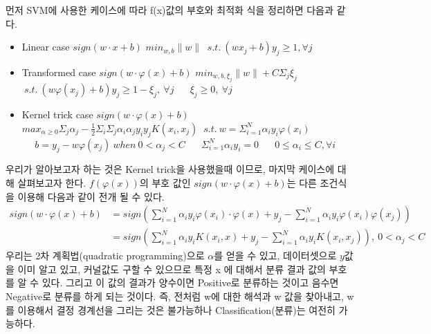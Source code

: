 \documentclass[a4paper]{oblivoir}
\begin{document}
\indent 먼저 SVM에 사용한 케이스에 따라 f(x)값의 부호와 최적화 식을 정리하면 다음과 같다.
\begin{itemize}\setlength\itemsep{-\parsep}
\item Linear case
\subitem $sign(w\cdot x+b)$
\subitem $min_{w,b} {\lVert w\rVert}$
\subitem $\ s.t.\ (wx_j+b)y_j\geq 1, \forall j$
\end{itemize}
\begin{itemize}\setlength\itemsep{-\parsep}
\item Transformed case
\subitem $sign(w\cdot\varphi(x)+b)$
\subitem $min_{w,b,\xi_j} {\lVert w\rVert}+C\Sigma_j \xi_j$
\subitem $\ s.t.\ (w\varphi(x_j)+b)y_j\geq1-\xi_j,\ \forall j$
\subitem $\ \ \ \ \ \ \xi_j\geq0,\ \forall j$
\end{itemize}
\begin{itemize}\setlength\itemsep{-\parsep}
\item Kernel trick case
\subitem $sign(w\cdot\varphi(x)+b)$
\subitem $max_{\alpha\geq 0} \Sigma_j \alpha_j- \frac{1}{2}\Sigma_i \Sigma_j \alpha_i \alpha_j y_i y_j K(x_i,x_j)$
\subitem $\ s.t.\ w=\Sigma_{i=1}^N\alpha_i y_i\varphi(x_i)$
\subitem $\ \ \ \ \ \ b=y_j-w\varphi(x_j)\ when\ 0<\alpha_j<C$
\subitem $\ \ \ \ \ \ \Sigma_{i=1}^{N} \alpha_i y_i=0$
\subitem $\ \ \ \ \ \ 0\leq \alpha_i\leq C,\forall i$
\end{itemize}
우리가 알아보고자 하는 것은 Kernel trick을 사용했을때 이므로, 마지막 케이스에 대해 살펴보고자 한다. $f(\varphi(x))$의 부호 값인 $sign(w\cdot\varphi(x)+b)$는 다른 조건식을 이용해 다음과 같이 전개 될 수 있다. 
\begin{equation}
\begin{split}
sign(w\cdot\varphi(x)+b)&=sign(\sum_{i=1}^N \alpha_i y_i \varphi(x_i)\cdot\varphi(x)+y_j-\sum_{i=1}^N \alpha_i y_i \varphi(x_i)\varphi(x_j))\\
&=sign(\sum_{i=1}^N \alpha_i y_i K(x_i,x)+y_j-\sum_{i=1}^N \alpha_i y_i K(x_i,x_j)),\ 0<\alpha_j<C
\end{split}
\label{eq:5-46}
\end{equation}
\indent 우리는 2차 계획법(quadratic programming)으로 $\alpha$를 얻을 수 있고, 데이터셋으로 $y$값을 이미 알고 있고, 커널값도 구할 수 있으므로 특정 x 에 대해서 분류 결과 값의 부호를 알 수 있다. 그리고 이 값의 결과가 양수이면 Positive로 분류하는 것이고 음수면 Negative로 분류를 하게 되는 것이다. 즉, 전처럼 w에 대한 해석과 w 값을 찾아내고, w를 이용해서 결정 경계선을 그리는 것은 불가능하나 Classification(분류)는 여전히 가능하다.\\
\end{document}
